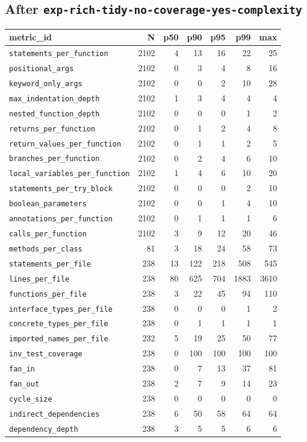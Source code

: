\documentclass[11pt]{article}
\begin{document}
\subsection{After \texttt{exp-rich-tidy-no-coverage-yes-complexity}}
\label{app:kiss-no-coverage-yes-complexity}

{\scriptsize
\begin{longtable}{@{}lrrrrrr@{}}
  \toprule
  metric\_id & N & p50 & p90 & p95 & p99 & max \\
  \midrule
  \endhead
  \texttt{statements\_per\_function} & 2102 & 4 & 13 & 16 & 22 & 25 \\
  \texttt{positional\_args} & 2102 & 0 & 3 & 4 & 8 & 16 \\
  \texttt{keyword\_only\_args} & 2102 & 0 & 0 & 2 & 10 & 28 \\
  \texttt{max\_indentation\_depth} & 2102 & 1 & 3 & 4 & 4 & 4 \\
  \texttt{nested\_function\_depth} & 2102 & 0 & 0 & 0 & 1 & 2 \\
  \texttt{returns\_per\_function} & 2102 & 0 & 1 & 2 & 4 & 8 \\
  \texttt{return\_values\_per\_function} & 2102 & 0 & 1 & 1 & 2 & 5 \\
  \texttt{branches\_per\_function} & 2102 & 0 & 2 & 4 & 6 & 10 \\
  \texttt{local\_variables\_per\_function} & 2102 & 1 & 4 & 6 & 10 & 20 \\
  \texttt{statements\_per\_try\_block} & 2102 & 0 & 0 & 0 & 2 & 10 \\
  \texttt{boolean\_parameters} & 2102 & 0 & 0 & 1 & 4 & 10 \\
  \texttt{annotations\_per\_function} & 2102 & 0 & 1 & 1 & 1 & 6 \\
  \texttt{calls\_per\_function} & 2102 & 3 & 9 & 12 & 20 & 46 \\
  \texttt{methods\_per\_class} & 81 & 3 & 18 & 24 & 58 & 73 \\
  \texttt{statements\_per\_file} & 238 & 13 & 122 & 218 & 508 & 545 \\
  \texttt{lines\_per\_file} & 238 & 80 & 625 & 704 & 1883 & 3610 \\
  \texttt{functions\_per\_file} & 238 & 3 & 22 & 45 & 94 & 110 \\
  \texttt{interface\_types\_per\_file} & 238 & 0 & 0 & 0 & 1 & 2 \\
  \texttt{concrete\_types\_per\_file} & 238 & 0 & 1 & 1 & 1 & 1 \\
  \texttt{imported\_names\_per\_file} & 232 & 5 & 19 & 25 & 50 & 77 \\
  \texttt{inv\_test\_coverage} & 238 & 0 & 100 & 100 & 100 & 100 \\
  \texttt{fan\_in} & 238 & 0 & 7 & 13 & 37 & 81 \\
  \texttt{fan\_out} & 238 & 2 & 7 & 9 & 14 & 23 \\
  \texttt{cycle\_size} & 238 & 0 & 0 & 0 & 0 & 0 \\
  \texttt{indirect\_dependencies} & 238 & 6 & 50 & 58 & 64 & 64 \\
  \texttt{dependency\_depth} & 238 & 3 & 5 & 5 & 6 & 6 \\
  \bottomrule
\end{longtable}
}
\end{document}
